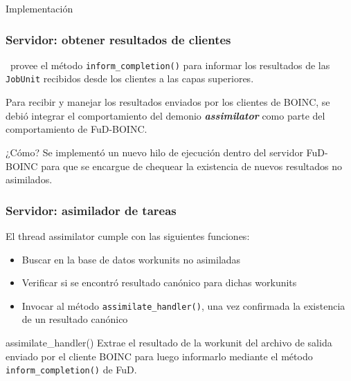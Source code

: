 \begin{subsection}{Implementación}
	\begin{frame}\frametitle{Servidor: obtener resultados de clientes}
		\begin{block}{}
			\fud \ provee el método \texttt{inform\_completion()} para informar los resultados de las \texttt{JobUnit} 
			recibidos desde los clientes a las capas superiores.
		\end{block}
		\vspace{2mm}
		\pause
		\begin{block}{}
			Para recibir y manejar los resultados enviados por los clientes de BOINC, se debió integrar 
			el comportamiento del demonio \textit{\textbf{assimilator}} como parte del comportamiento de FuD-BOINC.
		\end{block}
		\vspace{2mm}
		\pause
		\begin{block}{¿Cómo?}
			Se implementó un nuevo hilo de ejecución dentro del servidor FuD-BOINC para que se encargue de chequear 
			la existencia de nuevos resultados no asimilados.
		\end{block}
	\end{frame}

	\begin{frame}[fragile]\frametitle{Servidor: asimilador de tareas}
		\begin{block}{}
			El thread assimilator cumple con las siguientes funciones:
			\vspace{2mm}
			\begin{itemize}
				\item Buscar en la base de datos workunits no asimiladas
				\item Verificar si se encontró resultado canónico para dichas workunits
				\item Invocar al método \texttt{assimilate\_handler()}, una vez confirmada la existencia de un resultado canónico
			\end{itemize}
		\end{block}
		\pause
		\vspace{4mm}
		\begin{block}{assimilate\_handler()}
			Extrae el resultado de la workunit del archivo de salida enviado por el cliente BOINC para luego informarlo 
			mediante el método \texttt{inform\_completion()} de FuD.
		\end{block}
	\end{frame}


\end{subsection}
